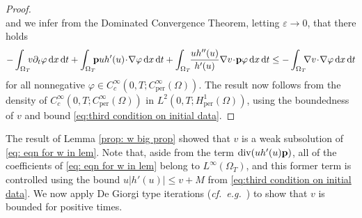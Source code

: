 \documentclass[11pt,a4paper,reqno]{amsart}
\theoremstyle{remark}
\theoremstyle{definition}
\numberwithin{equation}{section}
\newcommand{\per}{\mathrm{per}}
\DeclareMathOperator{\dv}{div}
\newcommand{\p}{{\bf p}}
\renewcommand{\d}{\, \mathrm{d} }
\begin{document}
\begin{proof}
\begin{equation*}
\end{equation*}
and we infer from the Dominated Convergence Theorem, letting $\varepsilon \to 0$, that there holds 
\begin{equation*}
   \begin{aligned} -\int_{\Omega_T} \!\!\! v \partial_t \varphi \d x \d t  + \int_{\Omega_T}\!\!\! \p u h'(u)\! \cdot \! \nabla \varphi  \d x \d t + \int_{\Omega_T} \!\! \frac{u h''(u)}{h'(u)} \nabla v \!\cdot\! \p \varphi \d x \d t  \leq - \int_{\Omega_T} \!\!\! \nabla v\!\cdot\!\nabla \varphi \d x \d t 
   \end{aligned}
\end{equation*}
for all nonnegative $\varphi \in C^\infty_c(0,T;C^\infty_\per(\Omega))$. The result now follows from the density of $C^\infty_c(0,T;C^\infty_\per(\Omega))$ in $L^2(0,T;H^1_\per(\Omega))$, using the boundedness of $v$ and bound \eqref{eq:third condition on initial data}. 
\end{proof}


The result of Lemma \ref{prop: w big prop} showed that $v$ is a weak subsolution of \eqref{eq: eqn for w in lem}. Note that, aside from the term $\dv(u h'(u)\p)$, all of the coefficients of \eqref{eq: eqn for w in lem} belong to $L^\infty(\Omega_T)$, and this former term is controlled using the bound $u|h'(u)| \leq v + M$ from \eqref{eq:third condition on initial data}. We now apply De Giorgi type iterations (\textit{cf.}~\textit{e.g.}~\cite[\S 3.1]{reg1}) to show that $v$ is bounded for positive times. 
\end{document}
